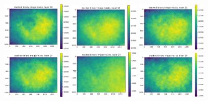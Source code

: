 \documentclass[letterpaper,11pt]{article}
\begin{document}
\begin{figure}[!ht]
\includegraphics[width=0.3\textwidth]{images/measuring_flatfield_corrections/mask_stack_layers/mask_stack_layer_18}
\includegraphics[width=0.3\textwidth]{images/measuring_flatfield_corrections/mask_stack_layers/mask_stack_layer_19}
\includegraphics[width=0.3\textwidth]{images/measuring_flatfield_corrections/mask_stack_layers/mask_stack_layer_22}
\includegraphics[width=0.3\textwidth]{images/measuring_flatfield_corrections/mask_stack_layers/mask_stack_layer_25}
\includegraphics[width=0.3\textwidth]{images/measuring_flatfield_corrections/mask_stack_layers/mask_stack_layer_26}
\includegraphics[width=0.3\textwidth]{images/measuring_flatfield_corrections/mask_stack_layers/mask_stack_layer_29}

\end{figure}
\end{document}
